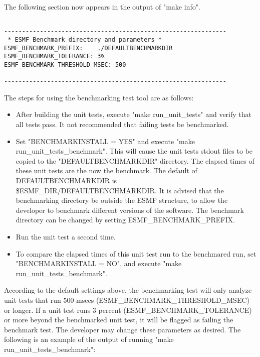 The following section now appears in the output of "make info".

\begin{verbatim}
 
--------------------------------------------------------------
 * ESMF Benchmark directory and parameters *
ESMF_BENCHMARK_PREFIX:    ./DEFAULTBENCHMARKDIR
ESMF_BENCHMARK_TOLERANCE: 3%
ESMF_BENCHMARK_THRESHOLD_MSEC: 500
 
--------------------------------------------------------------

\end{verbatim}

The steps for using the benchmarking test tool are as follows:

\begin{sloppypar}
\begin{itemize}
\item After building the unit tests, execute "make run\_unit\_tests" and 
verify that all tests pass. It not recommended that failing tests be benchmarked.
\item Set "BENCHMARKINSTALL = YES" and execute "make run\_unit\_tests\_benchmark".
This will cause the unit tests stdout files to be copied to the "DEFAULTBENCHMARKDIR"
directory. The elapsed times of these unit tests are the now the benchmark. 
The default of DEFAULTBENCHMARKDIR is \$ESMF\_DIR/DEFAULTBENCHMARKDIR.
It is advised that the benchmarking directory be outside the ESMF structure, to allow
the developer to benchmark different versions of the software. The benchmark directory
can be changed by setting ESMF\_BENCHMARK\_PREFIX.
\item Run the unit test a second time.
\item To compare the elapsed times of this unit test run to the benchmared run, set
"BENCHMARKINSTALL = NO", and execute "make run\_unit\_tests\_benchmark".
\end{itemize} 

According to the default settings above, the benchmarking test will only analyze unit tests that run 
500 msecs (ESMF\_BENCHMARK\_THRESHOLD\_MSEC)
or longer. If a unit test runs 3 percent (ESMF\_BENCHMARK\_TOLERANCE) or more beyond the benchmarked
unit test, it will be flagged as failing the benchmark test. The developer may change these parameters
as desired. The following is an example of the output of running "make run\_unit\_tests\_benchmark":

\end{sloppypar}
